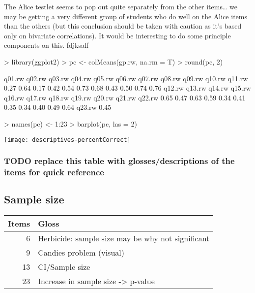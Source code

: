 \documentclass[11pt]{article}
\begin{document}
The Alice testlet seems to pop out quite separately from the other items\ldots{} we may be getting a very different group of students who do well on the Alice items than the others (but this conclusion should be taken with caution as it's based only on bivariate correlations).  It would be interesting to do some principle components on this.
fdjksalf
\begin{Schunk}
\begin{Sinput}
> library(ggplot2)
> pc <- colMeans(gp.rw, na.rm = T)
> round(pc, 2)
\end{Sinput}
\begin{Soutput}
q01.rw q02.rw q03.rw q04.rw q05.rw q06.rw q07.rw q08.rw q09.rw q10.rw q11.rw 
  0.27   0.64   0.17   0.42   0.54   0.73   0.68   0.43   0.50   0.74   0.76 
q12.rw q13.rw q14.rw q15.rw q16.rw q17.rw q18.rw q19.rw q20.rw q21.rw q22.rw 
  0.65   0.47   0.63   0.59   0.34   0.41   0.35   0.34   0.40   0.49   0.64 
q23.rw 
  0.45 
\end{Soutput}
\begin{Sinput}
> names(pc) <- 1:23
> barplot(pc, las = 2)
\end{Sinput}
\end{Schunk}
\texttt{[image: descriptives-percentCorrect]}



\subsubsection{{\bfseries\sffamily TODO} replace this table with glosses/descriptions of the items for quick reference}
\label{sec-3-1-1}

\subsection{Sample size}
\label{sec-3-2}
\begin{center}
\begin{tabular}{rl}
\textbf{Items} & \textbf{Gloss}\\
\hline
6 & Herbicide: sample size may be why not significant\\
9 & Candies problem (visual)\\
13 & CI/Sample size\\
23 & Increase in sample size -> p-value\\
\end{tabular}
\end{center}
\end{document}
